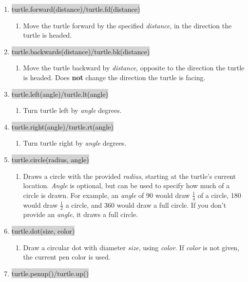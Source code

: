 \documentclass[11pt, letterpaper, onecolumn, oneside, final]{article}
\begin{document}
\begin{enumerate}
\item\colorbox{lightgray}{\consolas turtle.forward(distance)/turtle.fd(distance)}
\begin{enumerate}
\item Move the turtle forward by the specified \emph{distance}, in the direction the turtle is headed.
\end{enumerate}
\item\colorbox{lightgray}{\consolas turtle.backwards(distance)/turtle.bk(distance)}
\begin{enumerate}
\item Move the turtle backward by \emph{distance}, opposite to the direction the turtle is headed. Does \textbf{not} change the direction the turtle is facing.
\end{enumerate}
\item\colorbox{lightgray}{\consolas turtle.left(angle)/turtle.lt(angle)}
\begin{enumerate}
\item Turn turtle left by \emph{angle} degrees.
\end{enumerate}
\item\colorbox{lightgray}{\consolas turtle.right(angle)/turtle.rt(angle)}
\begin{enumerate}
\item Turn turtle right by \emph{angle} degrees.
\end{enumerate}
\item\colorbox{lightgray}{\consolas turtle.circle(radius, angle)}
\begin{enumerate}
\item Draws a circle with the provided \emph{radius}, starting at the turtle's current location. \emph{Angle} is optional, but can be used to specify how much of a circle is drawn. For example, an \emph{angle} of 90 would draw $\frac{1}{4}$ of a circle, 180 would draw $\frac{1}{2}$ a circle, and 360 would draw a full circle. If you don't provide an \emph{angle}, it draws a full circle.
\end{enumerate}
\item\colorbox{lightgray}{\consolas turtle.dot(size, color)}
\begin{enumerate}
\item Draw a circular dot with diameter \emph{size}, using \emph{color}. If \emph{color} is not given, the current pen color is used.
\end{enumerate}
\item\colorbox{lightgray}{\consolas turtle.penup()/turtle.up()}

\end{enumerate}
\end{document}
